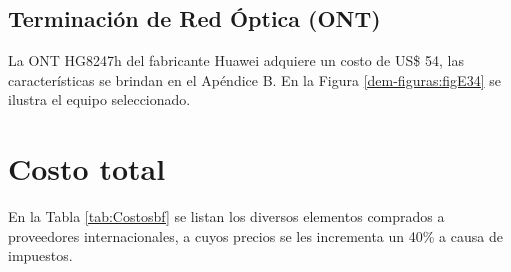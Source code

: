 \subsection{Terminación de Red Óptica (ONT)}
La ONT HG8247h del fabricante Huawei adquiere un costo de US\$ 54, las características se brindan en el Apéndice B. En la Figura \ref{dem-figuras:figE34} se ilustra el equipo seleccionado.



\section{Costo total}

En la Tabla \ref{tab:Costosbf} se listan los diversos elementos comprados a proveedores internacionales, a cuyos precios se les incrementa un 40\% a causa de impuestos.


